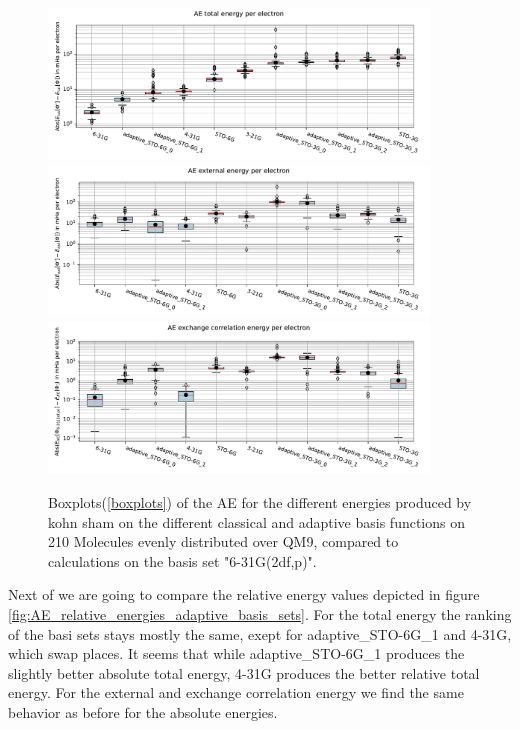 \begin{figure}
    \centering
    \includegraphics[width=0.9\textwidth]{chapters/results/results_images/adaptive_basis_functions/total_energy_adaptive_basis_sets}
    \includegraphics[width=0.9\textwidth]{chapters/results/results_images/adaptive_basis_functions/coulomb_energy_adaptive_basis_sets}
    \includegraphics[width=0.9\textwidth]{chapters/results/results_images/adaptive_basis_functions/exchange_correlation_energy_adaptive_basis_sets}
    \caption{Boxplots(\ref{boxplots}) of the AE for the different energies produced by kohn sham on the different classical and adaptive basis functions on 210 Molecules evenly distributed over QM9, compared to calculations on the basis set "6-31G(2df,p)".} \label{fig:AE_energies_adaptive_basis_sets}
\end{figure}
Next of we are going to compare the relative energy values depicted in figure \ref{fig:AE_relative_energies_adaptive_basis_sets}.
For the total energy the ranking of the basi sets stays mostly the same, exept for adaptive\_STO-6G\_1 and 4-31G, which swap places.
It seems that while adaptive\_STO-6G\_1 produces the slightly better absolute total energy, 4-31G produces the better relative total energy. For the external and exchange correlation energy we find the same behavior as before for the absolute energies.\\
